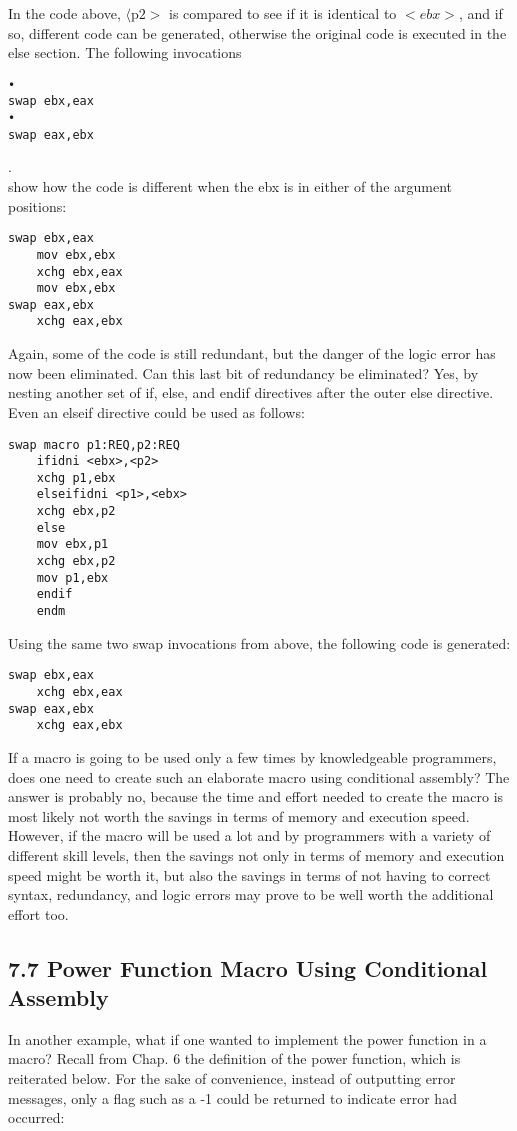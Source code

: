 \documentclass[10pt]{article}
\begin{document}
In the code above, $\langle\mathrm{p} 2>$ is compared to see if it is identical to $<e b x>$, and if so, different code can be generated, otherwise the original code is executed in the else section. The following invocations

\begin{verbatim}
•
swap ebx,eax
•
swap eax,ebx
\end{verbatim}

.\\
show how the code is different when the ebx is in either of the argument positions:

\begin{verbatim}
swap ebx,eax
    mov ebx,ebx
    xchg ebx,eax
    mov ebx,ebx
swap eax,ebx
    xchg eax,ebx
\end{verbatim}

Again, some of the code is still redundant, but the danger of the logic error has now been eliminated. Can this last bit of redundancy be eliminated? Yes, by nesting another set of if, else, and endif directives after the outer else directive. Even an elseif directive could be used as follows:

\begin{verbatim}
swap macro p1:REQ,p2:REQ
    ifidni <ebx>,<p2>
    xchg p1,ebx
    elseifidni <p1>,<ebx>
    xchg ebx,p2
    else
    mov ebx,p1
    xchg ebx,p2
    mov p1,ebx
    endif
    endm
\end{verbatim}

Using the same two swap invocations from above, the following code is generated:

\begin{verbatim}
swap ebx,eax
    xchg ebx,eax
swap eax,ebx
    xchg eax,ebx
\end{verbatim}

If a macro is going to be used only a few times by knowledgeable programmers, does one need to create such an elaborate macro using conditional assembly? The answer is probably no, because the time and effort needed to create the macro is most likely not worth the savings in terms of memory and execution speed. However, if the macro will be used a lot and by programmers with a variety of different skill levels, then the savings not only in terms of memory and execution speed might be worth it, but also the savings in terms of not having to correct syntax, redundancy, and logic errors may prove to be well worth the additional effort too.

\subsection*{7.7 Power Function Macro Using Conditional Assembly}
In another example, what if one wanted to implement the power function in a macro? Recall from Chap. 6 the definition of the power function, which is reiterated below. For the sake of convenience, instead of outputting error messages, only a flag such as a -1 could be returned to indicate error had occurred:
\end{document}
